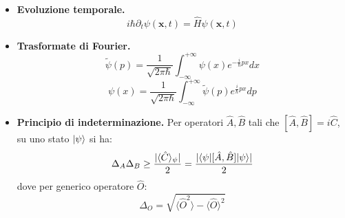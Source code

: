 \documentclass[11pt, a4paper]{scrartcl} %
\numberwithin{equation}{section}
\theoremstyle{style2}
\newtheorem{osservazione}{Osservazione}[section]
\theoremstyle{style1}
\begin{document}
\begin{multicols}{2}
\begin{itemize}
	\begin{osservazione}
	Il valore medio di spin \`e analogo, ma calcolato solo su stati di spin; la parte orbitale sparisce per normalizzazione.
	\end{osservazione}
	\item {\sffamily \bfseries Evoluzione temporale.}
		\begin{equation}
			i \hbar \partial _t \psi (\mathbf{x} ,t)= \hat{H} \psi (\mathbf{x} ,t)
		\end{equation}
	\item {\sffamily \bfseries Trasformate di Fourier.} 
		\begin{equation}
			\widetilde{\psi }(p) = \frac{1}{\sqrt{2\pi \hbar } } \int_{-\infty} ^{+\infty} \psi (x) e^{-\frac{i}{\hbar }px} dx
		\end{equation}
		\begin{equation}
			\psi (x) = \frac{1}{\sqrt{2 \pi \hbar } } \int_{-\infty} ^{+\infty } \widetilde{\psi }(p) e^{\frac{i}{\hbar }px}  dp 
		\end{equation}
		\item {\sffamily \bfseries Principio di indeterminazione.} 
			Per operatori $\hat{A},\hat{B}$ tali che $[\hat{A},\hat{B}] = i \hat{C}$, su uno stato $\ket{\psi } $ si ha:
			\begin{equation}
				\Delta _A \Delta _B \ge \frac{\lvert \langle \hat{C} \rangle_\psi  \rvert }{2} = \frac{\lvert \braket{\psi |[ \hat{A},\hat{B} ] |\psi }  \rvert }{2}
			\end{equation}
			dove per generico operatore $\hat{O}$:
			\begin{equation}
				\Delta _O = \sqrt{\langle \hat{O}^2 \rangle - \langle \hat{O} \rangle^2} 
			\end{equation}
	\end{itemize}
\end{multicols}
\end{document}
